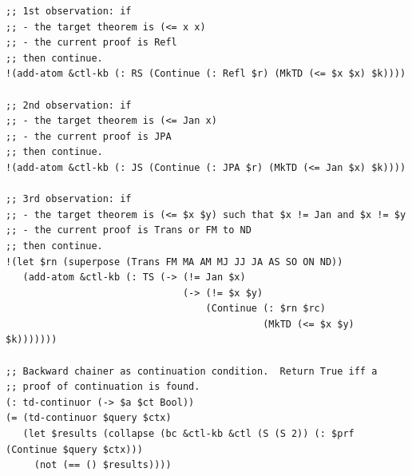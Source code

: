 \documentclass[aspectratio=169]{beamer}
\begin{document}
\begin{frame}[fragile]
  \begin{lstlisting}
;; 1st observation: if
;; - the target theorem is (<= x x)
;; - the current proof is Refl
;; then continue.
!(add-atom &ctl-kb (: RS (Continue (: Refl $r) (MkTD (<= $x $x) $k))))

;; 2nd observation: if
;; - the target theorem is (<= Jan x)
;; - the current proof is JPA
;; then continue.
!(add-atom &ctl-kb (: JS (Continue (: JPA $r) (MkTD (<= Jan $x) $k))))

;; 3rd observation: if
;; - the target theorem is (<= $x $y) such that $x != Jan and $x != $y
;; - the current proof is Trans or FM to ND
;; then continue.
!(let $rn (superpose (Trans FM MA AM MJ JJ JA AS SO ON ND))
   (add-atom &ctl-kb (: TS (-> (!= Jan $x)
                               (-> (!= $x $y)
                                   (Continue (: $rn $rc)
                                             (MkTD (<= $x $y) $k)))))))

;; Backward chainer as continuation condition.  Return True iff a
;; proof of continuation is found.
(: td-continuor (-> $a $ct Bool))
(= (td-continuor $query $ctx)
   (let $results (collapse (bc &ctl-kb &ctl (S (S 2)) (: $prf (Continue $query $ctx)))
     (not (== () $results))))
  \end{lstlisting}
\end{frame}
\end{document}
